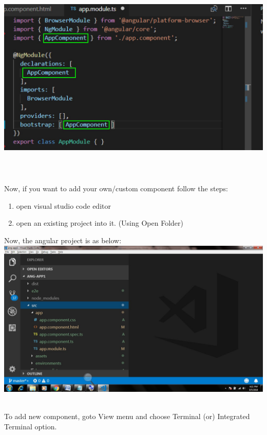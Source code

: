 \documentclass{article}
\begin{document}
	\noindent \includegraphics*[width=5.55in, height=3.12in]{IMG-02-02}


\noindent 

\noindent \\  \\ Now, if you want to add your own/custom component follow the steps:

\begin{enumerate}
	\item open visual studio code editor
	\item open an existing project into it. (Using Open Folder)
\end{enumerate}

\noindent 
    

\noindent Now, the angular project is as below: \\


	\noindent \includegraphics*[width=5.26in, height=2.96in]{IMG-02-03}

\noindent \\ To add new component, goto View menu and choose Terminal (or) Integrated Terminal option.
\end{document}
